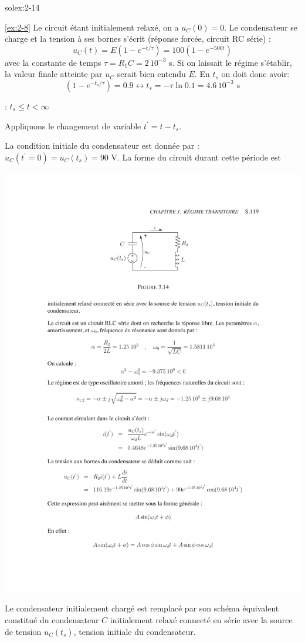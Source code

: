 \begin{exwithsol}{solex:2-14}
\begin{solexercise}{\ref{ex:2-8}}
Le circuit \'etant initialement relax\'e, on a $u_C(0)=0$. Le condensateur
se charge et la tension \`a ses  bornes s'\'ecrit (r\'eponse forc\'ee, circuit
RC s\'erie) :
\[u_C(t)=E(1-e^{-t/\tau})=100(1-e^{-500 t})\]
avec la constante de temps $\tau=R_1C=2\, 10^{-3}$ s.
Si on laissait le r\'egime s'\'etablir, la valeur finale atteinte par
$u_C$ serait bien entendu $E$. En $t_s$ on doit donc avoir:
\[(1-e^{-t_s/\tau})=0.9 \leftrightarrow t_s=-\tau\ln 0.1 = 4.6\,
10^{-3}\text{~s}\]

  : $t_s\leq t < \infty$

Appliquons le changement de variable $t^{'}=t-t_s$.

La condition initiale du condensateur est donn\'ee par :
$u_C(t^{'}=0)=u_C(t_s)=90$ V.
La forme du circuit durant cette p\'eriode est 
\begin{center}
	\includegraphics[width=\linewidth]{sol_exercices/ex3-8}
\end{center}
Le condensateur initialement charg\'e est remplac\'e
par son sch\'ema \'equivalent constitu\'e du condensateur $C$ initialement
relax\'e connect\'e en s\'erie avec la source de tension $u_C(t_s)$, tension
initiale du condensateur.



\end{solexercise}
\end{exwithsol}
